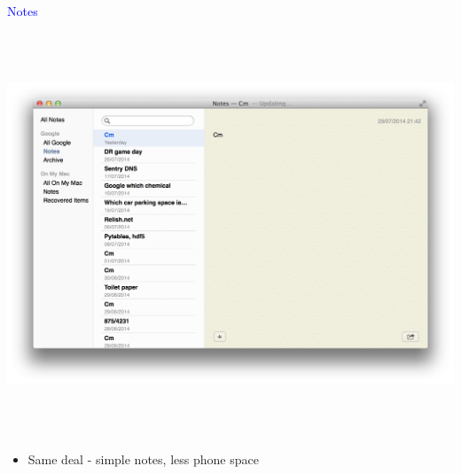 \documentclass[landscape]{slides}
\begin{document}
\begin{slide}

    \textcolor{blue}{\Large{Notes}}

    \begin{center}
        \includegraphics[height=12cm]{lifelog-notes}
    \end{center}

    \begin{itemize}
        \item Same deal - simple notes, less phone space
    \end{itemize}

\end{slide}


\end{document}
